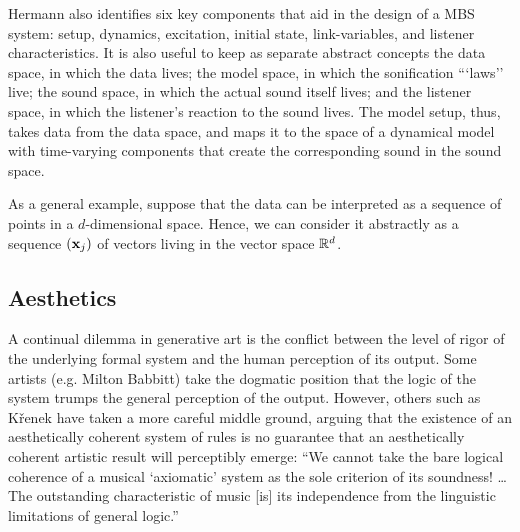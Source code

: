 Hermann also identifies six key components that aid in the design of a MBS system: setup, dynamics, excitation, initial state, link-variables, and listener characteristics. It is also useful to keep as separate abstract concepts the data space, in which the data lives; the model space, in which the sonification ```laws'' live; the sound space, in which the actual sound itself lives; and the listener space, in which the listener's reaction to the sound lives. The model setup, thus, takes data from the data space, and maps it to the space of a dynamical model with time-varying components that create the corresponding sound in the sound space. 

As a general example, suppose that the data can be interpreted as a sequence of points in a $d$-dimensional space. Hence, we can consider it abstractly as a sequence $(\mathbf{x}_j)$ of vectors living in the vector space $\mathbb{R}^d$.

\subsection{Aesthetics}
A continual dilemma in generative art is the conflict between the level of rigor of the underlying formal system and the human perception of its output. Some artists (e.g. Milton Babbitt) take the dogmatic position that the logic of the system trumps the general perception of the output. \cite{babbitt1958cares}  However, others such as K{\v{r}}enek have taken a more careful middle ground, arguing that the existence of an aesthetically coherent system of rules is no guarantee that an aesthetically coherent artistic result will perceptibly emerge: ``We cannot take the bare logical coherence of a musical `axiomatic' system as the sole criterion of its soundness! \dots The outstanding characteristic of music [is] its independence from the linguistic limitations of general logic.'' \cite{kvrenek1939music}